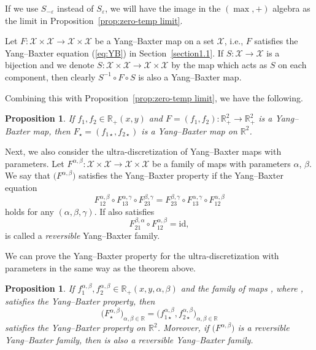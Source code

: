 \documentclass[pdftex]{sigma}
\numberwithin{equation}{section}
\newtheorem{Proposition}[Theorem]{Proposition}
 { \theoremstyle{definition}
\newtheorem{Definition}[Theorem]{Definition}
\newtheorem{Note}[Theorem]{Note}
\newtheorem{Example}[Theorem]{Example}
\newtheorem{Remark}[Theorem]{Remark} }
\def\R{\mathbb{R}}
\def\e{\varepsilon}
\def\id{\mathrm{id}}
\begin{document}
\begin{Remark}
If we use $S_{-\e}$ instead of $S_{\e}$,
we will have the image in the $(\max,+)$ algebra as the limit
in Proposition~\ref{prop:zero-temp limit}.
\end{Remark}

Let $F\colon \mathcal{X}\times \mathcal{X}\to \mathcal{X}\times \mathcal{X}$ be a
Yang--Baxter map on a set $\mathcal{X}$, i.e., $F$ satisfies the Yang--Baxter equation (\ref{eq:YB}) in Section~\ref{section1.1}.
If $S\colon \mathcal{X}\to \mathcal{X}$ is a bijection and we denote
$S\colon \mathcal{X}\times \mathcal{X}\to \mathcal{X}\times \mathcal{X}$ by the map which acts
as $S$ on each component, then clearly
$S^{-1}\circ F\circ S$ is also a Yang--Baxter map.

Combining this with Proposition~\ref{prop:zero-temp limit},
we have the following.

\begin{Proposition}
If $f_1,f_2\in\R_+(x,y)$ and
$F=(f_1,f_2)\colon\R_+^2\to\R_+^2$ is a Yang--Baxter map,
then $F_{\star}=(f_{1\star},f_{2\star})$ is a Yang--Baxter map
on $\R^2$.
\end{Proposition}

Next, we also consider the ultra-discretization of Yang--Baxter maps with parameters.
Let ${F^{\alpha,\beta}\colon \mathcal{X}\times \mathcal{X}\to \mathcal{X}\times \mathcal{X}}$ be a family of maps with parameters $\alpha$, $\beta$.
We say that $\bigl(F^{\alpha,\beta}\bigr)$ satisfies the Yang--Baxter property if the Yang--Baxter equation
\[
F_{12}^{\alpha,\beta}\circ F_{13}^{\alpha,\gamma}\circ F_{23}^{\beta,\gamma}=F_{23}^{\beta,\gamma}\circ F_{13}^{\alpha,\gamma}\circ F_{12}^{\alpha,\beta}
\]
holds for any $(\alpha,\beta,\gamma)$.
If  also satisfies
\[
F_{21}^{\beta,\alpha}\circ F_{12}^{\alpha,\beta}=\id,
\]
 is called a {\it reversible} Yang--Baxter family.

We can prove the Yang--Baxter property for the ultra-discretization with parameters in the same way as the theorem above.

\begin{Proposition}\label{prop:YBZL}
If $f_1^{\alpha,\beta},f_2^{\alpha,\beta}\in\R_+(x,y,\alpha,\beta)$ and
the family of maps
\smash{$\bigl(F^{\alpha,\beta}\bigr)_{\alpha,\beta\in\R_+}$}, where
\smash{$F^{\alpha,\beta}=\bigl(f_1^{\alpha,\beta},f_2^{\alpha,\beta}\bigr)\colon\R_+^2\to\R_+^2$},
satisfies the Yang--Baxter property,
then \[
\bigl(F_{\star}^{\alpha,\beta}\bigr)_{\alpha,\beta\in\R}=\bigl(f_{1\star}^{\alpha,\beta}, f_{2\star}^{\alpha,\beta}\bigr)_{\alpha,\beta\in\R}
\]
 satisfies the Yang--Baxter property on $\R^2$. Moreover, if $\bigl(F^{\alpha,\beta}\bigr)$ is a reversible Yang--Baxter family, then  is also a reversible Yang--Baxter family.
\end{Proposition}
\end{document}
